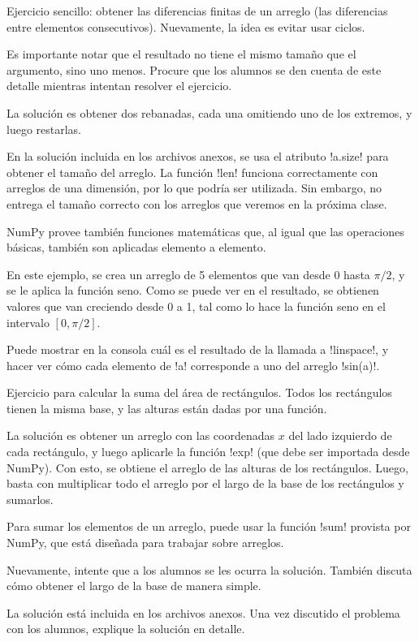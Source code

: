 \documentclass[10pt]{article}
\begin{document}

  Ejercicio sencillo:
  obtener las diferencias finitas de un arreglo
  (las diferencias entre elementos consecutivos).
  Nuevamente, la idea es evitar usar ciclos.

  Es importante notar
  que el resultado no tiene el mismo tamaño
  que el argumento,
  sino uno menos.
  Procure que los alumnos se den cuenta
  de este detalle mientras intentan resolver
  el ejercicio.

  La solución es obtener dos rebanadas,
  cada una omitiendo uno de los extremos,
  y luego restarlas.

  En la solución incluida en los archivos anexos,
  se usa el atributo \li!a.size!
  para obtener el tamaño del arreglo.
  La función \li!len! funciona correctamente
  con arreglos de una dimensión,
  por lo que podría ser utilizada.
  Sin embargo, no entrega el tamaño correcto
  con los arreglos que veremos en la próxima clase.


  NumPy provee también
  funciones matemáticas
  que, al igual que las operaciones básicas,
  también son aplicadas elemento a elemento.

  En este ejemplo,
  se crea un arreglo de 5 elementos
  que van desde 0 hasta \(\pi/2\),
  y se le aplica la función seno.
  Como se puede ver en el resultado,
  se obtienen valores que van
  creciendo desde 0 a 1,
  tal como lo hace la función seno
  en el intervalo \([0, \pi/2]\).

  Puede mostrar en la consola
  cuál es el resultado de la llamada
  a \li!linspace!,
  y hacer ver cómo cada elemento de \li!a!
  corresponde a uno del arreglo \li!sin(a)!.

  \label{ejercicio-integral}

  Ejercicio para calcular
  la suma del área de rectángulos.
  Todos los rectángulos tienen la misma base,
  y las alturas están dadas por una función.

  La solución es obtener un arreglo
  con las coordenadas \(x\)
  del lado izquierdo de cada rectángulo,
  y luego aplicarle la función \li!exp!
  (que debe ser importada desde NumPy).
  Con esto,
  se obtiene el arreglo
  de las alturas de los rectángulos.
  Luego, basta con multiplicar
  todo el arreglo
  por el largo de la base
  de los rectángulos
  y sumarlos.

  Para sumar los elementos de un arreglo,
  puede usar la función \li!sum!
  provista por NumPy,
  que está diseñada para trabajar sobre arreglos.

  Nuevamente,
  intente que a los alumnos se les ocurra la solución.
  También discuta cómo obtener el largo de la base
  de manera simple.

  La solución está incluida
  en los archivos anexos.
  Una vez discutido el problema con los alumnos,
  explique la solución en detalle.
\end{document}
